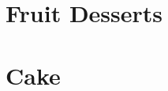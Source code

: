 \documentclass[twoside, openany]{book}
\newcommand{\dish}[1]{}
\begin{document}
\dish{Pie_dough}

\dish{Apple_pie}

\dish{Cherry_pie}

\dish{Rhubarb_pie}

\dish{Blueberry_tart}



\section{Fruit Desserts}

\dish{Baked_apples}

\dish{Berry_crumble}

\dish{Rhubarb_sauce}

\dish{Boiled_apples}

\dish{Lemon_bars}

\dish{Cherry_raspberry_sorbet}

\dish{Berry_jam}


\section{Cake}

\dish{Chocolate_cake}

\dish{Buttercream_frosting}

\dish{Cranberry_cake}

\dish{Raspberry_cheesecake}
\end{document}
